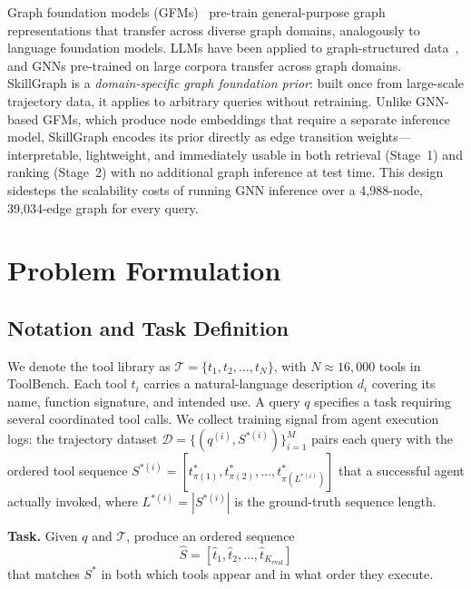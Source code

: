 \documentclass[lettersize,journal]{IEEEtran}
\begin{document}
Graph foundation models (GFMs)~\cite{gfm_survey} pre-train general-purpose graph representations that transfer across diverse graph domains, analogously to language foundation models.
LLMs have been applied to graph-structured data~\cite{gfm_survey}, and GNNs pre-trained on large corpora transfer across graph domains.
SkillGraph is a \emph{domain-specific graph foundation prior}: built once from large-scale trajectory data, it applies to arbitrary queries without retraining.
Unlike GNN-based GFMs, which produce node embeddings that require a separate inference model, SkillGraph encodes its prior directly as edge transition weights---interpretable, lightweight, and immediately usable in both retrieval (Stage~1) and ranking (Stage~2) with no additional graph inference at test time.
This design sidesteps the scalability costs of running GNN inference over a 4,988-node, 39,034-edge graph for every query.


\section{Problem Formulation}
\label{sec:problem}

\subsection{Notation and Task Definition}

We denote the tool library as $\mathcal{T} = \{t_1, t_2, \ldots, t_N\}$, with $N \approx 16{,}000$ tools in ToolBench.
Each tool $t_i$ carries a natural-language description $d_i$ covering its name, function signature, and intended use.
A query $q$ specifies a task requiring several coordinated tool calls.
We collect training signal from agent execution logs: the trajectory dataset $\mathcal{D} = \{(q^{(i)}, S^{*(i)})\}_{i=1}^{M}$ pairs each query with the ordered tool sequence $S^{*(i)} = [t_{\pi(1)}^*, t_{\pi(2)}^*, \ldots, t_{\pi(L^{*(i)})}^*]$ that a successful agent actually invoked, where $L^{*(i)} = |S^{*(i)}|$ is the ground-truth sequence length.

\textbf{Task.} Given $q$ and $\mathcal{T}$, produce an ordered sequence
\begin{equation}
\hat{S} = [\hat{t}_1, \hat{t}_2, \ldots, \hat{t}_{K_{\mathrm{eval}}}]
\label{eq:task}
\end{equation}
that matches $S^*$ in both which tools appear and in what order they execute.
\end{document}
